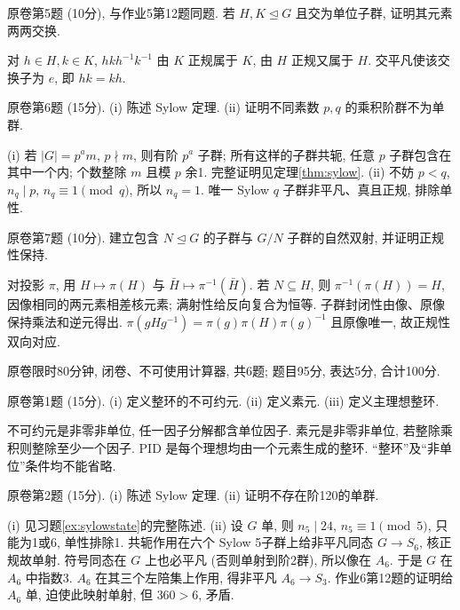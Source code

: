 \begin{exercise}\label{ex:commute}原卷第5题 (10分), 与作业5第12题同题. 若 $H,K\trianglelefteq G$ 且交为单位子群, 证明其元素两两交换.\end{exercise}
\begin{solution}
对 $h\in H,k\in K$, $hkh^{-1}k^{-1}$ 由 $K$ 正规属于 $K$, 由 $H$ 正规又属于 $H$. 交平凡使该交换子为 $e$, 即 $hk=kh$.
\end{solution}
\begin{exercise}\label{ex:sylowstate}原卷第6题 (15分). (i) 陈述 Sylow 定理. (ii) 证明不同素数 $p,q$ 的乘积阶群不为单群.\end{exercise}
\begin{solution}
(i) 若 $|G|=p^am$, $p\nmid m$, 则有阶 $p^a$ 子群; 所有这样的子群共轭, 任意 $p$ 子群包含在其中一个内; 个数整除 $m$ 且模 $p$ 余1. 完整证明见定理\ref{thm:sylow}. (ii) 不妨 $p<q$, $n_q\mid p$, $n_q\equiv1\pmod q$, 所以 $n_q=1$. 唯一 Sylow $q$ 子群非平凡、真且正规, 排除单性.
\end{solution}
\begin{exercise}原卷第7题 (10分). 建立包含 $N\trianglelefteq G$ 的子群与 $G/N$ 子群的自然双射, 并证明正规性保持.\end{exercise}
\begin{solution}
对投影 $\pi$, 用 $H\mapsto\pi(H)$ 与 $\bar H\mapsto\pi^{-1}(\bar H)$. 若 $N\subseteq H$, 则 $\pi^{-1}(\pi(H))=H$, 因像相同的两元素相差核元素; 满射性给反向复合为恒等. 子群封闭性由像、原像保持乘法和逆元得出. $\pi(gHg^{-1})=\pi(g)\pi(H)\pi(g)^{-1}$ 且原像唯一, 故正规性双向对应.
\end{solution}
原卷限时80分钟, 闭卷、不可使用计算器, 共6题; 题目95分, 表达5分, 合计100分.
\begin{exercise}原卷第1题 (15分). (i) 定义整环的不可约元. (ii) 定义素元. (iii) 定义主理想整环.\end{exercise}
\begin{solution}
不可约元是非零非单位, 任一因子分解都含单位因子. 素元是非零非单位, 若整除乘积则整除至少一个因子. PID 是每个理想均由一个元素生成的整环. “整环”及“非单位”条件均不能省略.
\end{solution}
\begin{exercise}\label{ex:120}原卷第2题 (15分). (i) 陈述 Sylow 定理. (ii) 证明不存在阶120的单群.\end{exercise}
\begin{solution}
(i) 见习题\ref{ex:sylowstate}的完整陈述. (ii) 设 $G$ 单, 则 $n_5\mid24$, $n_5\equiv1\pmod5$, 只能为1或6, 单性排除1. 共轭作用在六个 Sylow 5子群上给非平凡同态 $G\to S_6$, 核正规故单射. 符号同态在 $G$ 上也必平凡 (否则单射到阶2群), 所以像在 $A_6$. 于是 $G$ 在 $A_6$ 中指数3. $A_6$ 在其三个左陪集上作用, 得非平凡 $A_6\to S_3$. 作业6第12题的证明给 $A_6$ 单, 迫使此映射单射, 但 $360>6$, 矛盾.
\end{solution}
